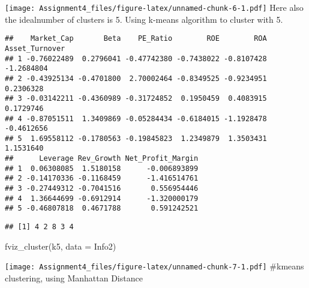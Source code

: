 \documentclass[
]{article}
\newenvironment{Shaded}{\begin{snugshade}}{\end{snugshade}}
\newcommand{\AttributeTok}[1]{\textcolor[rgb]{0.77,0.63,0.00}{#1}}
\newcommand{\CommentTok}[1]{\textcolor[rgb]{0.56,0.35,0.01}{\textit{#1}}}
\newcommand{\DecValTok}[1]{\textcolor[rgb]{0.00,0.00,0.81}{#1}}
\newcommand{\FunctionTok}[1]{\textcolor[rgb]{0.00,0.00,0.00}{#1}}
\newcommand{\NormalTok}[1]{#1}
\newcommand{\OtherTok}[1]{\textcolor[rgb]{0.56,0.35,0.01}{#1}}
\newcommand{\SpecialCharTok}[1]{\textcolor[rgb]{0.00,0.00,0.00}{#1}}
\begin{document}
\texttt{[image: Assignment4\_files/figure-latex/unnamed-chunk-6-1.pdf]}
Here also the idealnumber of clusters is 5. Using k-means algorithm to
cluster with 5.

\begin{Shaded}
\end{Shaded}

\begin{verbatim}
##    Market_Cap       Beta    PE_Ratio        ROE        ROA Asset_Turnover
## 1 -0.76022489  0.2796041 -0.47742380 -0.7438022 -0.8107428     -1.2684804
## 2 -0.43925134 -0.4701800  2.70002464 -0.8349525 -0.9234951      0.2306328
## 3 -0.03142211 -0.4360989 -0.31724852  0.1950459  0.4083915      0.1729746
## 4 -0.87051511  1.3409869 -0.05284434 -0.6184015 -1.1928478     -0.4612656
## 5  1.69558112 -0.1780563 -0.19845823  1.2349879  1.3503431      1.1531640
##      Leverage Rev_Growth Net_Profit_Margin
## 1  0.06308085  1.5180158      -0.006893899
## 2 -0.14170336 -0.1168459      -1.416514761
## 3 -0.27449312 -0.7041516       0.556954446
## 4  1.36644699 -0.6912914      -1.320000179
## 5 -0.46807818  0.4671788       0.591242521
\end{verbatim}

\begin{Shaded}
\end{Shaded}

\begin{verbatim}
## [1] 4 2 8 3 4
\end{verbatim}

\begin{Shaded}
\begin{Highlighting}[]
\FunctionTok{fviz\_cluster}\NormalTok{(k5, }\AttributeTok{data =}\NormalTok{ Info2) }
\end{Highlighting}
\end{Shaded}

\texttt{[image: Assignment4\_files/figure-latex/unnamed-chunk-7-1.pdf]}
\#kmeans clustering, using Manhattan Distance
\end{document}
